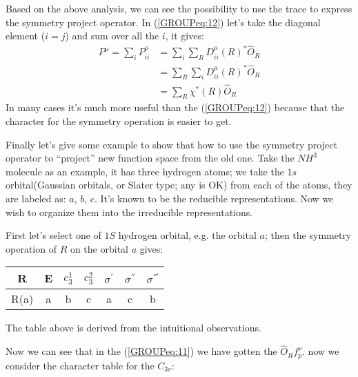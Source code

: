 Based on the above analysis, we can see the possibility to use the
trace to express the symmetry project operator. In (\ref{GROUPeq:12})
let's take the diagonal element ($i=j$) and sum over all the $i$, it
gives:
\begin{align}\label{}
  P^{\mu}=\sum_{i}P^{\mu}_{ii} &=
  \sum_{i}\sum_{R}D^{\mu}_{ii}(R)^{*}\hat{O}_{R} \nonumber \\
  &=\sum_{R}\sum_{i}D^{\mu}_{ii}(R)^{*}\hat{O}_{R} \nonumber \\
  &=\sum_{R}\chi^{*}(R)\hat{O}_{R}
\end{align}
In many cases it's much more useful than the (\ref{GROUPeq:12})
because that the character for the symmetry operation is easier to
get.

Finally let's give some example to show that how to use the symmetry
project operator to ``project'' new function space from the old one.
Take the $NH^{3}$ molecule as an example, it has three hydrogen atoms;
we take the $1s$ orbital(Gaussian orbitals, or Slater type; any is OK)
from each of the atoms, they are labeled as: $a$, $b$, $c$. It's known
to be the reducible representations. Now we wish to organize them into
the irreducible representations.

First let's select one of $1S$ hydrogen orbital, e.g. the orbital $a$;
then the symmetry operation of $R$ on the orbital $a$ gives:

\begin{center}
  \begin{tabular}{ c|c c c c c c }
    \hline
    R   & E & $c^{1}_{3}$ & $c^{2}_{3}$ & $\sigma^{'}$
    & $\sigma^{''}$ & $\sigma^{'''}$ \\
    \hline
    R(a) & a & b & c & a & c & b \\
  \end{tabular}
\end{center}
The table above is derived from the intuitional observations.

Now we can see that in the (\ref{GROUPeq:11}) we have gotten the
$\hat{O}_{R}f^{\nu}_{p}$. now we consider the character table for the
$C_{3v}$:

